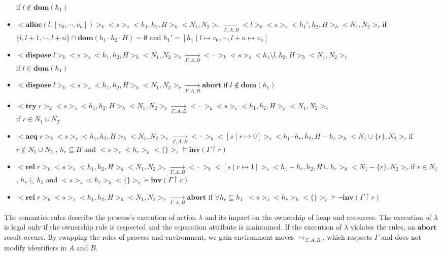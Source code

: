 \documentclass{lmcs} %
\theoremstyle{plain}\newtheorem{satz}[thm]{Satz} %
\begin{document}
\begin{itemize}
if $l\notin \mathbf{dom}(h_1)$
\item $<\!\!\mathbf{alloc}(l,[v_0,\cdots,v_n])\!\!>_k<\!\!s\!\!>_s<\!\!h_1,h_2,H\!\!>_h<\!\!N_1,N_2\!\!>_r\xrightarrow[\Gamma, A, B]{}<\!\!l\!\!>_k<\!\!s\!\!>_s<\!\!h_1',h_2,H\!\!>_h<\!\!N_1,N_2\!\!>_r$\;\;if $\{l,l+1,\cdots,l+n\}\cap \mathbf{dom}(h_1\cdot h_2 \cdot H)=\emptyset$ and $h_1'=[h_1 \mid l\mapsto v_0,\cdots,l+n\mapsto v_n]$
\item $<\!\!\mathbf{dispose}\;l\!\!>_k<\!\!s\!\!>_s<\!\!h_1,h_2,H\!\!>_h<\!\!N_1,N_2\!\!>_r\xrightarrow[\Gamma, A, B]{}<\!\!\cdot\!\!>_k<\!\!s\!\!>_s<\!\!h_1\setminus l,h_2,H\!\!>_h<\!\!N_1,N_2\!\!>_r$\\
if $l\in \mathbf{dom}(h_1)$
\item $<\!\!\mathbf{dispose}\;l\!\!>_k<\!\!s\!\!>_s<\!\!h_1,h_2,H\!\!>_h<\!\!N_1,N_2\!\!>_r\xrightarrow[\Gamma, A, B]{}\mathbf{abort}$ \;\;
if $l\notin \mathbf{dom}(h_1)$
\item $<\!\!\mathbf{try}\;r\!\!>_k<\!\!s\!\!>_s<\!\!h_1,h_2,H\!\!>_h<\!\!N_1,N_2\!\!>_r\xrightarrow[\Gamma, A, B]{}<\!\!\cdot\!\!>_k<\!\!s\!\!>_s<\!\!h_1,h_2,H\!\!>_h<\!\!N_1,N_2\!\!>_r$ \\
if $r\in N_1 \cup N_2$
\item $<\!\!\mathbf{acq}\;r\!\!>_k<\!\!s\!\!>_s<\!\!h_1,h_2,H\!\!>_h<\!\!N_1,N_2\!\!>_r\xrightarrow[\Gamma, A, B]{}<\!\!\cdot\!\!>_k<\!\![s\mid r\mapsto0]\!\!>_s<\!\!h_1\cdot h_r,h_2,H-h_r\!\!>_h<\!\!N_1\cup\{r\},N_2\!\!>_r$\;\;if $r \notin N_1\cup N_2$ , $h_r \subseteq H$ and $<\!\!s\!\!>_s<\!\!h_r\!\!>_h<\!\!\{\}\!\!>_r\models \mathbf{inv}(\Gamma\upharpoonright r)$
\item $<\!\!\mathbf{rel}\;r\!\!>_k<\!\!s\!\!>_s<\!\!h_1,h_2,H\!\!>_h<\!\!N_1,N_2\!\!>_r\xrightarrow[\Gamma, A, B]{}<\!\!\cdot\!\!>_k<\!\![s\mid r\mapsto1]\!\!>_s<\!\!h_1- h_r,h_2,H\cup h_r\!\!>_h<\!\!N_1-\{r\},N_2\!\!>_r$\;\;if $r \in N_1$ , $h_r \subseteq h_1$ and $<\!\!s\!\!>_s<\!\!h_r\!\!>_h<\!\!\{\}\!\!>_r\models \mathbf{inv}(\Gamma\upharpoonright r)$
\item $<\!\!\mathbf{rel}\;r\!\!>_k<\!\!s\!\!>_s<\!\!h_1,h_2,H\!\!>_h<\!\!N_1,N_2\!\!>_r\xrightarrow[\Gamma, A, B]{}\mathbf{abort}$ \;\;\;\;\;\;
if $\forall h_r\subseteq h_1 \;\;<\!\!s\!\!>_s<\!\!h_r\!\!>_h<\!\!\{\}\!\!>_r \models \neg\mathbf{inv}(\Gamma\upharpoonright r)$
\end{itemize}
The semantics rules describe the process's execution of action $\lambda$ and its impact on the ownership of heap and resources. The execution of $\lambda$ is legal only if the ownership rule is respected and the separation attribute is maintained. If the execution of $\lambda$ violates the rules, an $\mathbf{abort}$ result occurs. By swapping the roles of process and environment, we gain environment moves $\rightsquigarrow_{\Gamma, A, B}$, which respects $\Gamma$ and does not modify identifiers in $A$ and $B$.
\end{document}
